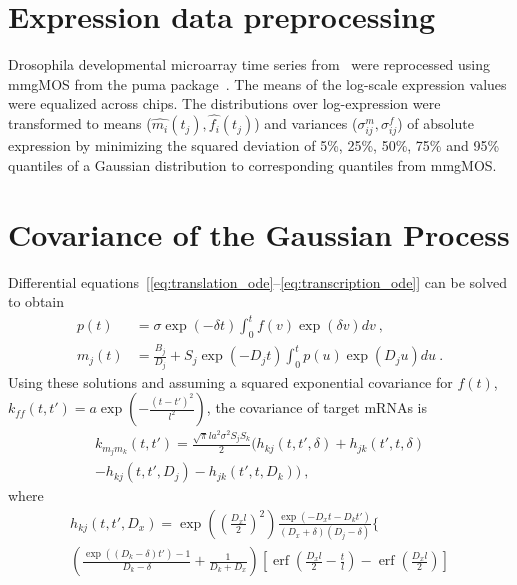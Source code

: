 \documentclass{pnastwo}
\newcommand{\erf}{\operatorname{erf}}
\begin{document}
\begin{article}
\begin{materials}
  \section{Expression data preprocessing} Drosophila developmental
  microarray time series from~\cite{Tomancak2002} were reprocessed
  using mmgMOS from the puma package~\cite{Pearson2009}.  The means of
  the log-scale expression values were equalized across chips.  The
  distributions over log-expression were transformed to means
  ($\hat{m_i}(t_j), \hat{f_i}(t_j)$) and variances ($\sigma^m_{ij},
  \sigma^f_{ij}$) of absolute expression by minimizing the squared
  deviation of 5\%, 25\%, 50\%, 75\% and 95\% quantiles of a Gaussian
  distribution to corresponding quantiles from mmgMOS.

  \section{Covariance of the Gaussian Process}
  Differential
  equations~[\ref{eq:translation_ode}--\ref{eq:transcription_ode}]
  can be solved to obtain
  \begin{align*}
    p(t) &= \sigma \exp(-\delta t) \int_0^t f(v) \exp(\delta v) dv\ , \\
    m_j(t) &= \frac{B_j}{D_j} + S_j \exp(-D_j t) \int_0^t p(u)
    \exp(D_j u) du\ .
  \end{align*}
  Using these solutions and assuming a squared exponential covariance
  for $f(t)$, $k_{ff}(t, t') = a \exp\left( -\frac{(t-t')^2}{l^2}
  \right)$, the covariance of target mRNAs is
  \begin{multline*}
    k_{m_j m_k}(t, t')
    = \frac{\sqrt{\pi} l a^2 \sigma^2 S_j S_k}{2} \bigg(
    h_{kj}(t, t', \delta) + h_{jk}(t', t, \delta) \\
    - h_{kj}(t, t', D_j) - h_{jk}(t', t, D_k)
    \bigg)\ ,
  \end{multline*}
  where
  \begin{multline*}
    h_{kj}(t, t', D_x) = 
    \exp\left(\left(\frac{D_x l}{2}\right)^2\right)
    \frac{\exp(-D_x t - D_k t')}{(D_x + \delta) (D_j - \delta)}
    \bigg\{ 
    \\
    \left(\frac{\exp((D_k-\delta) t') - 1}{D_k-\delta} +
      \frac{1}{D_k + D_x} \right)
    [\erf(\frac{D_x l}{2} - \frac{t}{l}) - \erf(\frac{D_x l}{2})]
    \\

\end{multline*}
\end{materials}
\end{article}
\end{document}
